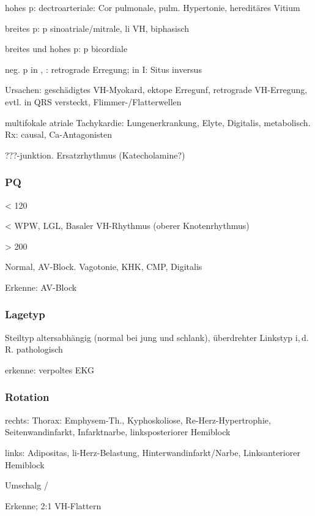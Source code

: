 hohes p: dectroarteriale: Cor pulmonale, pulm. Hypertonie, hereditäres Vitium

breites p: p sinoatriale/mitrale, li VH,  biphasisch

breites und hohes p: p bicordiale

neg. p in , : retrograde Erregung; in I: Situs inversus

Ursachen: 
geschädigtes VH-Myokard, ektope Erregunf, retrograde VH-Erregung, evtl. in QRS versteckt, Flimmer-/Flatterwellen





multifokale atriale Tachykardie: Lungenerkrankung, Elyte, Digitalis, metabolisch. Rx: causal, Ca-Antagonisten

???-junktion. Ersatzrhythmus (Katecholamine?)


\subsubsection{PQ}

< 120

< WPW, LGL, Basaler VH-Rhythmus (oberer Knotenrhythmus)

> 200 

Normal, AV-Block. Vagotonie, KHK, CMP, Digitalis

Erkenne: AV-Block \textdegree

\subsubsection{Lagetyp}

 Steiltyp altersabhängig (normal bei jung und schlank), überdrehter Linkstyp i,\,d.\,R. pathologisch

erkenne: verpoltes EKG

\subsubsection{Rotation}

rechts: Thorax: Emphysem-Th., Kyphoskoliose, Re-Herz-Hypertrophie, Seitenwandinfarkt, Infarktnarbe, linksposteriorer Hemiblock

links: Adipositas, li-Herz-Belastung, Hinterwandinfarkt/Narbe, Linksanteriorer Hemiblock

Umschalg /

Erkenne; 2:1 VH-Flattern

